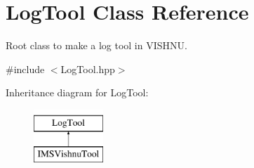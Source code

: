 \hypertarget{classLogTool}{
\section{LogTool Class Reference}
\label{classLogTool}
}


Root class to make a log tool in VISHNU.  




{\ttfamily \#include $<$LogTool.hpp$>$}

Inheritance diagram for LogTool:\begin{figure}[H]
\begin{center}
\leavevmode
\includegraphics[height=2.000000cm]{classLogTool}
\end{center}
\end{figure}
